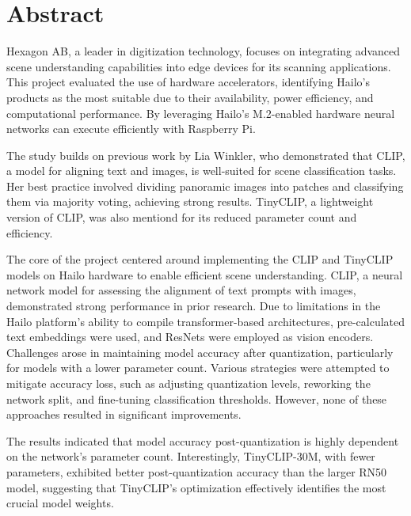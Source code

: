%
%
%

\chapter*{Abstract}

Hexagon AB, a leader in digitization technology, focuses on integrating advanced scene understanding capabilities into edge devices for its scanning applications.
This project evaluated the use of hardware accelerators, identifying Hailo's products as the most suitable due to their availability, power efficiency, and computational performance.
By leveraging Hailo's M.2-enabled hardware neural networks can execute efficiently with Raspberry Pi.

The study builds on previous work by Lia Winkler, who demonstrated that CLIP, a model for aligning text and images, is well-suited for scene classification tasks.
Her best practice involved dividing panoramic images into patches and classifying them via majority voting, achieving strong results. TinyCLIP, a lightweight version of CLIP, was also mentiond for its reduced parameter count and efficiency.\hfill\break
    
The core of the project centered around implementing the CLIP and TinyCLIP models on Hailo hardware to enable efficient scene understanding. 
CLIP, a neural network model for assessing the alignment of text prompts with images, demonstrated strong performance in prior research. 
Due to limitations in the Hailo platform's ability to compile transformer-based architectures, pre-calculated text embeddings were used, and ResNets were employed as vision encoders. 
Challenges arose in maintaining model accuracy after quantization, particularly for models with a lower parameter count. 
Various strategies were attempted to mitigate accuracy loss, such as adjusting quantization levels, reworking the network split, and fine-tuning classification thresholds. 
However, none of these approaches resulted in significant improvements.\hfill\break 

The results indicated that model accuracy post-quantization is highly dependent on the network’s parameter count. 
Interestingly, TinyCLIP-30M, with fewer parameters, exhibited better post-quantization accuracy than the larger RN50 model, suggesting that TinyCLIP’s optimization effectively identifies the most crucial model weights. 

    
	